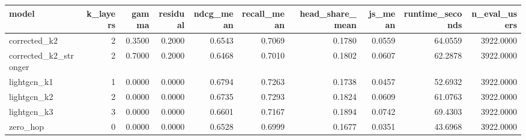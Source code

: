 \begin{tabular}{lrrrrrrrrr}
\toprule
model & k_layers & gamma & residual & ndcg_mean & recall_mean & head_share_mean & js_mean & runtime_seconds & n_eval_users \\
\midrule
corrected_k2 & 2 & 0.3500 & 0.2000 & 0.6543 & 0.7069 & 0.1780 & 0.0559 & 64.0559 & 3922.0000 \\
corrected_k2_stronger & 2 & 0.7000 & 0.2000 & 0.6468 & 0.7010 & 0.1802 & 0.0607 & 62.2878 & 3922.0000 \\
lightgcn_k1 & 1 & 0.0000 & 0.0000 & 0.6794 & 0.7263 & 0.1738 & 0.0457 & 52.6932 & 3922.0000 \\
lightgcn_k2 & 2 & 0.0000 & 0.0000 & 0.6735 & 0.7293 & 0.1824 & 0.0609 & 61.0763 & 3922.0000 \\
lightgcn_k3 & 3 & 0.0000 & 0.0000 & 0.6601 & 0.7167 & 0.1894 & 0.0742 & 69.4303 & 3922.0000 \\
zero_hop & 0 & 0.0000 & 0.0000 & 0.6528 & 0.6999 & 0.1677 & 0.0351 & 43.6968 & 3922.0000 \\
\bottomrule
\end{tabular}
